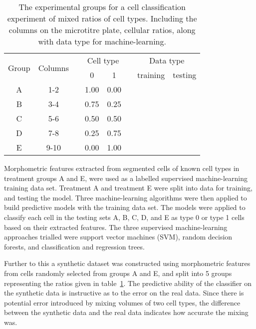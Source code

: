 \begin{table}[htbp!]
\centering
\caption[Cell classification mixed ratio groups]{The experimental groups for a cell classification experiment of mixed ratios of cell types. Including the columns on the microtitre plate, cellular ratios, along with data type for machine-learning.}
\label{table:endothelial_morphometry:cell_classification:cell_proportions}
\begin{tabular}{c c c c c c c c}
\toprule
\multirow{2}{*}{Group} & \multirow{2}{*}{Columns} & & \multicolumn{2}{c}{Cell type} & & \multicolumn{2}{c}{Data type} \\
\cmidrule{4-5}
\cmidrule{7-8}
	& & & 0 & 1 & & training & testing \\
\midrule
	A & 1-2  & & 1.00 & 0.00 & & \cmark & \cmark \\
	B & 3-4  & & 0.75 & 0.25 & & \xmark & \cmark \\
	C & 5-6  & & 0.50 & 0.50 & & \xmark & \cmark \\
	D & 7-8  & & 0.25 & 0.75 & & \xmark & \cmark \\
	E & 9-10 & & 0.00 & 1.00 & & \cmark & \cmark \\
\bottomrule
\end{tabular}
\end{table}

Morphometric features extracted from segmented cells of known cell types in treatment groups A and E, were used as a labelled supervised machine-learning training data set. Treatment A and treatment E were split into data for training, and testing the model. Three machine-learning algorithms were then applied to build predictive models with the training data set. The models were applied to classify each cell in the testing sets A, B, C, D, and E as type 0 or type 1 cells based on their extracted features. The three supervised machine-learning approaches trialled were support vector machines (SVM), random decision forests, and classification and regression trees.

Further to this a synthetic dataset was constructed using morphometric features from cells randomly selected from groups A and E, and split into 5 groups representing the ratios given in table~\ref{table:endothelial_morphometry:cell_classification:cell_proportions}. The predictive ability of the classifier on the synthetic data is instructive as to the error on the real data. Since there is potential error introduced by mixing volumes of two cell types, the difference between the synthetic data and the real data indicates how accurate the mixing was.

